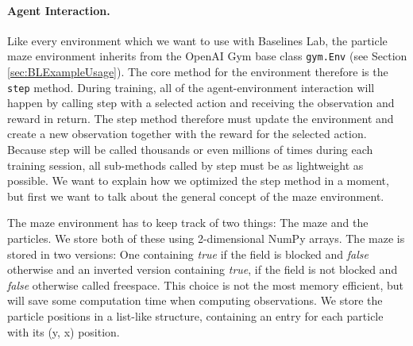\paragraph{Agent Interaction.}
Like every environment which we want to use with Baselines Lab, the particle maze environment inherits from the OpenAI Gym base class \texttt{gym.Env} (see Section \ref{sec:BLExampleUsage}). The core method for the environment therefore is the \texttt{step} method. During training, all of the agent-environment interaction will happen by calling step with a selected action and receiving the observation and reward in return. The step method therefore must update the environment and create a new observation together with the reward for the selected action. Because step will be called thousands or even millions of times during each training session, all sub-methods called by step must be as lightweight as possible. We want to explain how we optimized the step method in a moment, but first we want to talk about the general concept of the maze environment.

The maze environment has to keep track of two things: The maze and the particles. We store both of these using 2-dimensional NumPy arrays. The maze is stored in two versions: One containing \textit{true} if the field is blocked and \textit{false} otherwise and an inverted version containing \textit{true}, if the field is not blocked and \textit{false} otherwise called freespace. This choice is not the most memory efficient, but will save some computation time when computing observations. We store the particle positions in a list-like structure, containing an entry for each particle with its (y, x) position. 

